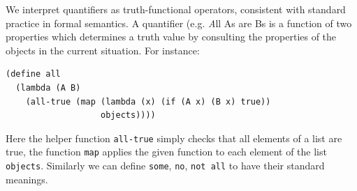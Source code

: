 \documentclass[10pt,letterpaper]{article}
\begin{document}
%



%
%




We interpret quantifiers as truth-functional operators, consistent with standard practice in formal semantics.
A quantifier (e.g. {\emph All As are Bs} is a function of two properties which determines a truth value by consulting the properties of the objects in the current situation. For instance:
\begin{lstlisting}
(define all 
  (lambda (A B) 
    (all-true (map (lambda (x) (if (A x) (B x) true)) 
                   objects))))
\end{lstlisting}
Here the helper function \lstinline{all-true} simply checks that all elements of a list are true, the function \lstinline{map} applies the given function to each element of the list \lstinline{objects}. Similarly we can define \lstinline{some}, \lstinline{no}, \lstinline{not all} to have their standard meanings. 
\end{document}
